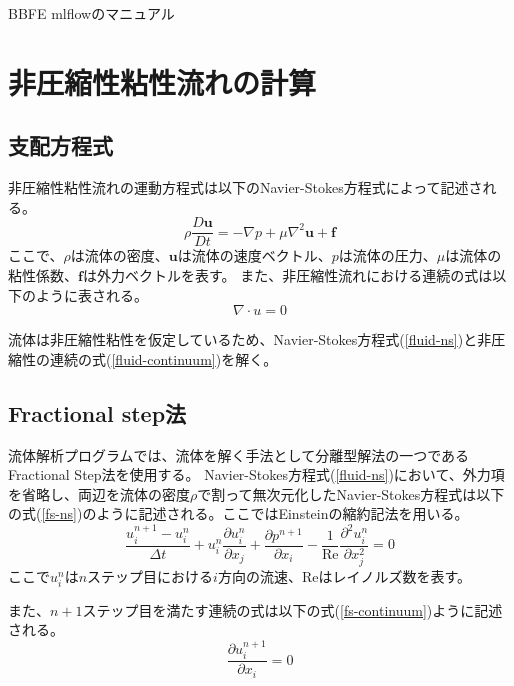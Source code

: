 \documentclass[8pt,a4paper]{article}
\newcommand{\bm}{\boldsymbol}
\begin{document}
 

\begin{center}
	{\Large BBFE mlflowのマニュアル} \\
\end{center}

\tableofcontents

\newpage
\section{非圧縮性粘性流れの計算}
\subsection{支配方程式}
非圧縮性粘性流れの運動方程式は以下のNavier-Stokes方程式によって記述される。
\begin{equation}
\label{fluid-ns}
\rho \frac{D\bm{u}}{Dt} = - \nabla p + \mu \nabla^{2} \bm{u} + \bm{f}
\end{equation}
ここで、$\rho$は流体の密度、$\bm{u}$は流体の速度ベクトル、$p$は流体の圧力、$\mu$は流体の粘性係数、$\bm{f}$は外力ベクトルを表す。
また、非圧縮性流れにおける連続の式は以下のように表される。
\begin{equation}
\label{fluid-continuum}
\nabla \cdot u = 0
\end{equation}

流体は非圧縮性粘性を仮定しているため、Navier-Stokes方程式(\ref{fluid-ns})と非圧縮性の連続の式(\ref{fluid-continuum})を解く。

\subsection{Fractional step法}
流体解析プログラムでは、流体を解く手法として分離型解法の一つであるFractional Step法を使用する。
Navier-Stokes方程式(\ref{fluid-ns})において、外力項を省略し、両辺を流体の密度$\rho$で割って無次元化したNavier-Stokes方程式は以下の式(\ref{fs-ns})のように記述される。ここではEinsteinの縮約記法を用いる。
\begin{equation}
\label{fs-ns}
	\frac{u^{n+1}_i - u^{n}_i}{\Delta t} + u^{n}_i \frac{\partial u^{n}_i}{\partial x_j}
	+ \frac{\partial p^{n+1}}{\partial x_i} - \frac{1}{\mathrm{Re}} \frac{\partial^{2} u^{n}_i}{\partial x^{2}_j} = 0
\end{equation}
ここで$u^{n}_{i}$は$n$ステップ目における$i$方向の流速、$\mathrm{Re}$はレイノルズ数を表す。

また、$n+1$ステップ目を満たす連続の式は以下の式(\ref{fs-continuum})ように記述される。
\begin{equation}
\label{fs-continuum}
	\frac{\partial u_{i}^{n+1}}{\partial x_{i}}=0
\end{equation}
\end{document}
